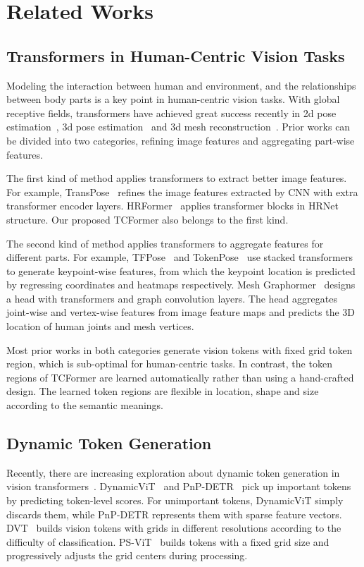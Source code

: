 \documentclass[10pt,twocolumn,letterpaper]{article}
\begin{document}
\section{Related Works}

\subsection{Transformers in Human-Centric Vision Tasks}
Modeling the interaction between human and environment, and the relationships between body parts is a key point in human-centric vision tasks. With global receptive fields, transformers have achieved great success recently in 2d pose estimation~\cite{li2021tokenpose,yuan2021hrformer,mao2021tfpose,yang2020transpose}, 3d pose estimation~\cite{zheng20213d,hampali2021handsformer,huang2020hot} and 3d mesh reconstruction~\cite{lin2021mesh,lin2021end}. 
Prior works can be divided into two categories, \ie refining image features and aggregating part-wise features.

The first kind of method applies transformers to extract better image features. For example, TransPose~\cite{yang2020transpose} refines the image features extracted by CNN with extra transformer encoder layers. HRFormer~\cite{yuan2021hrformer} applies transformer blocks in HRNet~\cite{sun2019deep} structure.
Our proposed TCFormer also belongs to the first kind.

The second kind of method applies transformers to aggregate features for different parts. 
For example, TFPose~\cite{mao2021tfpose} and TokenPose~\cite{li2021tokenpose} use stacked transformers to generate keypoint-wise features, from which the keypoint location is predicted by regressing coordinates and heatmaps respectively.
Mesh Graphormer~\cite{lin2021mesh} designs a head with transformers and graph convolution layers. The head aggregates joint-wise and vertex-wise features from image feature maps and predicts the 3D location of human joints and mesh vertices.


Most prior works in both categories generate vision tokens with fixed grid token region, which is sub-optimal for human-centric tasks. 
In contrast, the token regions of TCFormer are learned automatically rather than using a hand-crafted design. The learned token regions are flexible in location, shape and size according to the semantic meanings.


\subsection{Dynamic Token Generation}
Recently, there are increasing exploration about dynamic token generation in vision transformers~\cite{rao2021dynamicvit,wang2021not,yue2021vision,wang2021pnp}.
DynamicViT~\cite{rao2021dynamicvit} and PnP-DETR~\cite{wang2021pnp} pick up important tokens by predicting token-level scores.
For unimportant tokens, DynamicViT simply discards them, while PnP-DETR represents them with sparse feature vectors.
DVT~\cite{wang2021not} builds vision tokens with grids in different resolutions according to the difficulty of classification. 
PS-ViT~\cite{yue2021vision} builds tokens with a fixed grid size and progressively adjusts the grid centers during processing.
\end{document}
